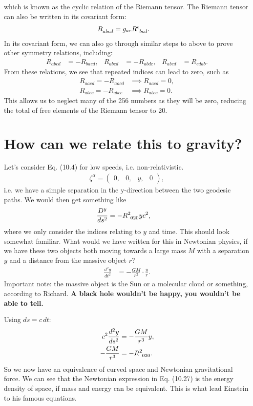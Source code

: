 \documentclass[a4paper, 11pt, normalem]{report}
\begin{document}
which is known as the cyclic relation of the Riemann tensor.
The Riemann tensor can also be written in its covariant form:
\begin{align}
    \tensor{R}{_{abcd}} &= g_{ae}\tensor{R}{^e_{bcd}}.
\end{align}
In its covariant form, we can also go through similar steps to above to prove other symmetry relations, including:
\begin{align}
    R_{abcd} &= -R_{bacd}, & R_{abcd} &= -R_{abdc}, & R_{abcd} &= R_{cdab}.
\end{align}
From these relations, we see that repeated indices can lead to zero, such as
\begin{align}
    R_{aacd} = -R_{aacd} &\implies R_{aacd} = 0, \\
    R_{abcc} = -R_{abcc} &\implies R_{abcc} = 0.
\end{align}
This allows us to neglect many of the 256 numbers as they will be zero, reducing the total of free elements of the Riemann tensor to 20.

\section{How can we relate this to gravity?}
Let's consider Eq. (10.4) for low speeds, i.e. non-relativistic. 
\begin{align}
    \zeta^\alpha = \begin{pmatrix} 0, & 0, & y, & 0 \end{pmatrix},
\end{align}
i.e. we have a simple separation in the y-direction between the two geodesic paths. 
We would then get something like
\begin{align}
    \frac{D^y}{ds^2} &= -\tensor{R}{^2_{020}}yc^2,
\end{align}
where we only consider the indices relating to $y$ and time. 
This should look somewhat familiar. 
What would we have written for this in Newtonian physics, if we have these two objects both moving towards a large mass $M$ with a separation $y$ and a distance from the massive object $r$?
\begin{align}
    \frac{d^2y}{dt^2} &= -\frac{GM}{r^2}\cdot\frac{y}{r}.
\end{align}
Important note: the massive object is the Sun or a molecular cloud or something, according to Richard.
\textbf{A black hole wouldn't be happy, you wouldn't be able to tell.}

Using $ds=c\,dt$:
\begin{align}
    c^2\frac{d^2y}{ds^2} &= -\frac{GM}{r^3}y,\\
    -\frac{GM}{r^3} &= -\tensor{R}{^2_{020}}.
\end{align}
So we now have an equivalence of curved space and Newtonian gravitational force. 
We can see that the Newtonian expression in Eq. (10.27) is the energy density of space, if mass and energy can be equivalent.
This is what lead Einstein to his famous equations. 
\end{document}
